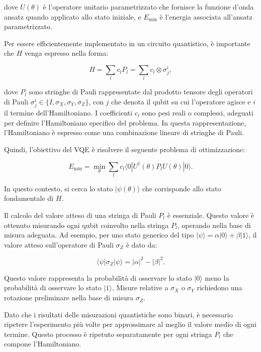 dove $U(\theta)$ è l'operatore unitario parametrizzato che fornisce la funzione 
d'onda ansatz quando applicato allo stato iniziale, e $E_{\min}$ è l'energia 
associata all'ansatz parametrizzato.

Per essere efficientemente implementato in un circuito quantistico, è importante
che $H$ venga espresso nella forma:

\begin{equation}
    H = \sum_{l} c_l P_l = \sum_{l} c_l \otimes \sigma_j^i,
\end{equation}

dove \(P_l\) sono stringhe di Pauli rappresentate dal prodotto tensore degli 
operatori di Pauli \(\sigma_j^i \in \{I, \sigma_X, \sigma_Y, \sigma_Z\}\), 
con \(j\) che denota il qubit su cui l'operatore agisce e \(i\) il termine 
dell'Hamiltoniano. I coefficienti \(c_l\) sono pesi reali o complessi, 
adeguati per definire l'Hamiltoniano specifico del problema. In questa 
rappresentazione, l'Hamiltoniano è espresso come una combinazione lineare 
di stringhe di Pauli.

Quindi, l'obiettivo del VQE è risolvere il seguente problema di ottimizzazione:

\begin{equation}
    E_{\text{min}} = \min_\theta \sum_{l} c_l \langle 0 | U^\dagger(\theta) P_l U(\theta) | 0 \rangle.
\end{equation}

In questo contesto, si cerca lo stato \(|\psi(\theta)\rangle\) che corrisponde 
allo stato fondamentale di \(H\).

Il calcolo del valore atteso di una stringa di Pauli \(P_l\) è essenziale. 
Questo valore è ottenuto misurando ogni qubit coinvolto nella stringa \(P_l\), 
operando nella base di misura adeguata. Ad esempio, per uno stato generico del 
tipo \(|\psi\rangle = \alpha |0\rangle + \beta |1\rangle\), il valore atteso 
sull'operatore di Pauli \(\sigma_Z\) è dato da:

\begin{equation}
    \langle \psi | \sigma_Z | \psi \rangle = |\alpha|^2 - |\beta|^2.
\end{equation}

Questo valore rappresenta la probabilità di osservare lo stato \(|0\rangle\) meno 
la probabilità di osservare lo stato \(|1\rangle\). Misure relative a \(\sigma_X\) 
o \(\sigma_Y\) richiedono una rotazione preliminare nella base di misura \(\sigma_Z\).

Dato che i risultati delle misurazioni quantistiche sono binari, è necessario 
ripetere l'esperimento più volte per approssimare al meglio il valore medio 
di ogni termine. Questo processo è ripetuto separatamente per ogni stringa 
\(P_l\) che compone l'Hamiltoniano.

